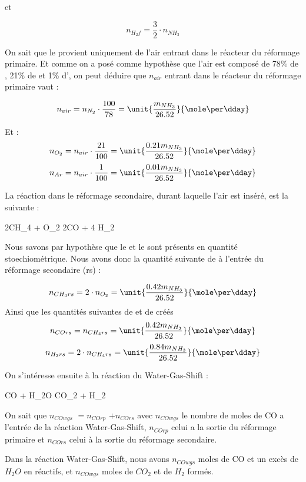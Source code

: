 et 

$$n_{H_2f} = \frac{3}{2} \cdot n_{NH_3}$$

On sait que le  provient uniquement de l'air entrant 
dans le réacteur du  réformage primaire. Et comme on a posé comme hypothèse
que l'air est composé de 78\% de , 21\% de 
et 1\% d', on peut déduire que $n_{air}$ entrant dans le 
réacteur du réformage primaire vaut : 

$$n_{air}= n_{N_2} \cdot \frac{100}{78} = \unit{\frac{m_{NH_3}}{26.52}}{\mole\per\dday}$$ 

Et :
$$n_{O_2}= n_{air} \cdot \frac{21}{100} = \unit{\frac{0.21m_{NH_3}}{26.52}}{\mole\per\dday}$$
$$n_{Ar}= n_{air} \cdot \frac{1}{100} = \unit{\frac{0.01m_{NH_3}}{26.52}}{\mole\per\dday}$$

La réaction dans le réformage secondaire, durant laquelle l'air est inséré, est la suivante :
\begin{chemmath}
	2CH_4 + O_2 \Longrightarrow 2CO + 4 H_2
\end{chemmath}  

Nous savons par hypothèse que le
 et le  sont présents en quantité stoechiométrique. Nous avons donc la quantité suivante de  à l'entrée du réformage secondaire (rs) : 

$$n_{CH_4rs} = 2 \cdot n_{O_2} = \unit{\frac{0.42m_{NH_3}}{26.52}}{\mole\per\dday}$$
Ainsi que les quantités suivantes de  et de  créés 
$$n_{COrs} = n_{CH_4rs} =  \unit{\frac{0.42m_{NH_3}}{26.52}} {\mole\per\dday}$$
$$n_{H_2rs} = 2 \cdot n_{CH_4rs} =  \unit{\frac{0.84m_{NH_3}}{26.52}}{\mole\per\dday}$$

On s'intéresse ensuite à la réaction du Water-Gas-Shift : 

\begin{chemmath}
	CO + H_2O \Longrightarrow CO_2 + H_2
\end{chemmath} 

On sait que $n_{COwgs}$  $= n_{COrp}$ 
$+ n_{COrs}$ avec $n_{COwgs}$ le nombre de moles de CO a l'entrée de la réaction Water-Gas-Shift, $n_{COrp}$ celui a la sortie du réformage primaire et $n_{COrs}$ celui à la sortie du réformage secondaire.

Dans la réaction Water-Gas-Shift, nous avons $n_{COwgs}$ moles de CO et un excès de $H_2O$ en réactifs, et $n_{COwgs}$ moles de $CO_2$ et de $H_2$ formés.


